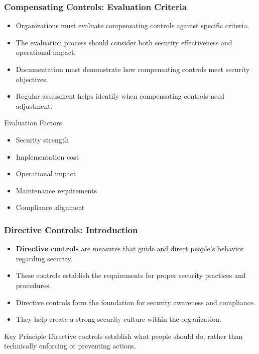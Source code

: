 \documentclass{beamer}
\begin{document}
\begin{frame}
    \frametitle{Compensating Controls: Evaluation Criteria}
    
    \begin{itemize}
        \item Organizations must evaluate compensating controls against specific criteria.
        
        \item The evaluation process should consider both security effectiveness and operational impact.
        
        \item Documentation must demonstrate how compensating controls meet security objectives.
        
        \item Regular assessment helps identify when compensating controls need adjustment.
    \end{itemize}
    
    \begin{exampleblock}{Evaluation Factors}
        \begin{itemize}
            \item Security strength
            \item Implementation cost
            \item Operational impact
            \item Maintenance requirements
            \item Compliance alignment
        \end{itemize}
    \end{exampleblock}
\end{frame}
\begin{frame}
    \frametitle{Directive Controls: Introduction}
    
    \begin{itemize}
        \item \textbf{Directive controls} are measures that guide and direct people's behavior regarding security.
        
        \item These controls establish the requirements for proper security practices and procedures.
        
        \item Directive controls form the foundation for security awareness and compliance.
        
        \item They help create a strong security culture within the organization.
    \end{itemize}
    
    \begin{alertblock}{Key Principle}
        Directive controls establish what people should do, rather than technically enforcing or preventing actions.
    \end{alertblock}
\end{frame}
\end{document}
